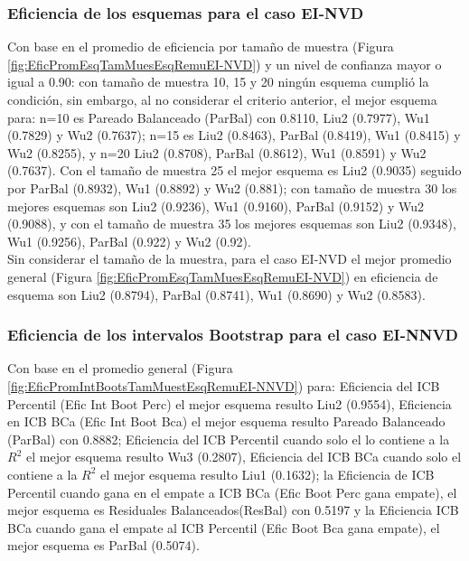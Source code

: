 \subsubsection{Eficiencia de los esquemas para el caso EI-NVD}
Con base en el promedio de eficiencia por tamaño de muestra (Figura \ref{fig:EficPromEsqTamMuesEsqRemuEI-NVD}) y un nivel de confianza mayor o igual a 0.90: con tamaño de muestra 10, 15 y 20 ningún esquema cumplió la condición,
sin embargo, al no considerar el criterio anterior, el mejor esquema para: n=10 es Pareado Balanceado (ParBal) con 0.8110, Liu2 (0.7977), Wu1 (0.7829) y Wu2 (0.7637); n=15 es Liu2 (0.8463), ParBal (0.8419), Wu1 (0.8415) y Wu2 (0.8255), y n=20 Liu2 (0.8708), ParBal (0.8612), Wu1 (0.8591) y Wu2 (0.7637). Con el tamaño de muestra 25 el mejor esquema es Liu2 (0.9035) seguido por ParBal (0.8932), Wu1 (0.8892) y Wu2 (0.881); con tamaño de muestra 30 los mejores esquemas son Liu2 (0.9236),  Wu1 (0.9160), ParBal (0.9152) y Wu2 (0.9088), y con el tamaño de muestra 35 los mejores esquemas son Liu2 (0.9348),  Wu1 (0.9256), ParBal (0.922) y Wu2 (0.92).\\

Sin considerar el tamaño de la muestra, para el caso EI-NVD el mejor promedio general (Figura \ref{fig:EficPromEsqTamMuesEsqRemuEI-NVD}) en eficiencia de esquema son Liu2 (0.8794), ParBal (0.8741), Wu1 (0.8690) y Wu2 (0.8583).




\subsubsection{Eficiencia de los intervalos Bootstrap para el caso EI-NNVD}
Con base en el promedio general (Figura \ref{fig:EficPromIntBootsTamMuestEsqRemuEI-NNVD}) para: Eficiencia del ICB Percentil (Efic Int Boot Perc) el mejor esquema resulto Liu2 (0.9554), Eficiencia en ICB BCa (Efic Int Boot Bca) el mejor esquema resulto Pareado Balanceado (ParBal) con 0.8882; Eficiencia del ICB Percentil cuando solo el lo contiene a la $R^{2}$ el mejor esquema resulto Wu3 (0.2807), Eficiencia del ICB BCa cuando solo el contiene a la $R^{2}$ el mejor esquema resulto Liu1 (0.1632); la Eficiencia de ICB Percentil cuando gana en el empate a ICB BCa (Efic Boot Perc gana empate), el mejor esquema es Residuales Balanceados(ResBal) con 0.5197 y la Eficiencia ICB BCa cuando gana el empate al ICB Percentil (Efic Boot Bca gana empate), el mejor esquema es ParBal (0.5074).\\

